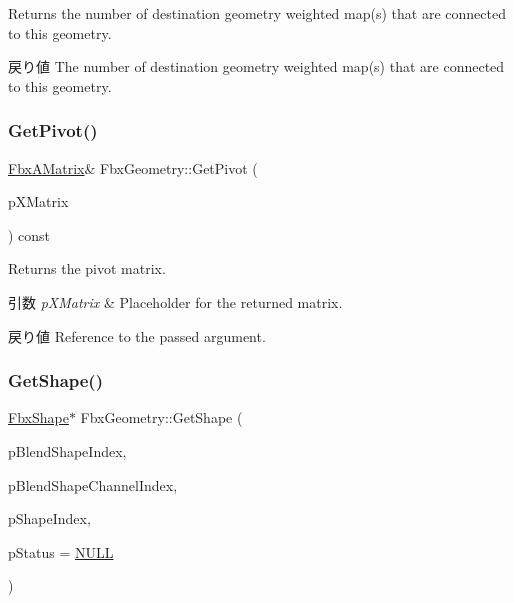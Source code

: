 Returns the number of destination geometry weighted map(s) that are connected to this geometry. \begin{DoxyReturn}{戻り値}
The number of destination geometry weighted map(s) that are connected to this geometry. 
\end{DoxyReturn}
\mbox{\label{class_fbx_geometry_abba9072e0a3f1ad52033996f9809df80}} 
\subsubsection{\texorpdfstring{Get\+Pivot()}{GetPivot()}}
{\footnotesize\ttfamily \hyperlink{class_fbx_a_matrix}{Fbx\+A\+Matrix}\& Fbx\+Geometry\+::\+Get\+Pivot (\begin{DoxyParamCaption}\item[{\hyperlink{class_fbx_a_matrix}{Fbx\+A\+Matrix} \&}]{p\+X\+Matrix }\end{DoxyParamCaption}) const}

Returns the pivot matrix. 
\begin{DoxyParams}{引数}
{\em p\+X\+Matrix} & Placeholder for the returned matrix. \\
\hline
\end{DoxyParams}
\begin{DoxyReturn}{戻り値}
Reference to the passed argument. 
\end{DoxyReturn}
\mbox{\label{class_fbx_geometry_a8a60c0db307689b6d4fb6055055a1601}} 
\subsubsection{\texorpdfstring{Get\+Shape()}{GetShape()}\hspace{0.1cm}{\footnotesize\ttfamily [1/2]}}
{\footnotesize\ttfamily \hyperlink{class_fbx_shape}{Fbx\+Shape}$\ast$ Fbx\+Geometry\+::\+Get\+Shape (\begin{DoxyParamCaption}\item[{int}]{p\+Blend\+Shape\+Index,  }\item[{int}]{p\+Blend\+Shape\+Channel\+Index,  }\item[{int}]{p\+Shape\+Index,  }\item[{\hyperlink{class_fbx_status}{Fbx\+Status} $\ast$}]{p\+Status = {\ttfamily \hyperlink{fbxarch_8h_a070d2ce7b6bb7e5c05602aa8c308d0c4}{N\+U\+LL}} }\end{DoxyParamCaption})}

